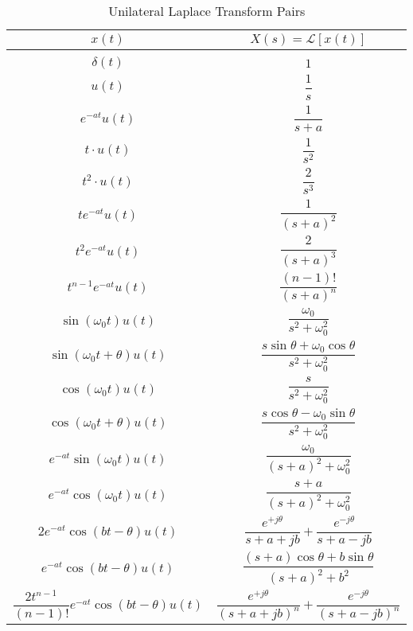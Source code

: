 \documentclass{report}
\begin{document}
\begin{table}[hbt!]
    \centering
    \caption{Unilateral Laplace Transform Pairs}
    \label{laplace_pairs}
    \begin{tabular}{|c|c|}
        \hline
        $x(t)$ & $X(s)=\mathcal{L}[x(t)]$ \\[0.15cm]
        \hline
        & \\[0.1cm]
        $\delta(t)$ & $1$ \\[0.5cm]
        $u(t)$ & $\dfrac{1}{s}$ \\[0.5cm]
        $e^{-at}u(t)$ & $\dfrac{1}{s+a}$ \\[0.5cm]
        $t\cdot u(t)$ & $\dfrac{1}{s^2}$ \\[0.5cm]
        $t^2\cdot u(t)$ & $\dfrac{2}{s^3}$ \\[0.5cm]
        $te^{-at}u(t)$ & $\dfrac{1}{(s+a)^2}$ \\[0.5cm]
        $t^2e^{-at}u(t)$ & $\dfrac{2}{(s+a)^3}$ \\[0.5cm]
        $t^{n-1}e^{-at}u(t)$ & $\dfrac{(n-1)!}{(s+a)^n}$ \\[0.5cm]
        $\sin(\omega_0 t)u(t)$ & $\dfrac{\omega_0}{s^2+\omega_0^2}$ \\[0.5cm]
        $\sin(\omega_0 t+\theta)u(t)$ & $\dfrac{s\sin\theta + \omega_0\cos\theta}{s^2+\omega_0^2}$ \\[0.5cm]
        $\cos(\omega_0 t)u(t)$ & $\dfrac{s}{s^2+\omega_0^2}$ \\[0.5cm]
        $\cos(\omega_0 t+\theta)u(t)$ & $\dfrac{s\cos\theta - \omega_0\sin\theta}{s^2+\omega_0^2}$ \\[0.5cm]
        $e^{-at}\sin(\omega_0 t)u(t)$ & $\dfrac{\omega_0}{(s+a)^2+\omega_0^2}$ \\[0.5cm]
        $e^{-at}\cos(\omega_0 t)u(t)$ & $\dfrac{s+a}{(s+a)^2+\omega_0^2}$ \\[0.5cm]
        $2e^{-at}\cos(bt-\theta)u(t)$ & $\dfrac{e^{+j\theta}}{s+a+jb}+\dfrac{e^{-j\theta}}{s+a-jb}$ \\[0.5cm]
        $e^{-at}\cos(bt-\theta)u(t)$ & $\dfrac{(s+a)\cos\theta+b\sin\theta}{(s+a)^2+b^2}$ \\[0.5cm]
        $\dfrac{2t^{n-1}}{(n-1)!}e^{-at}\cos(bt-\theta)u(t)$ & $\dfrac{e^{+j\theta}}{(s+a+jb)^n}+\dfrac{e^{-j\theta}}{(s+a-jb)^n}$ \\[0.5cm]
        \hline
    \end{tabular}
\end{table}

\pagebreak [4]
\end{document}
